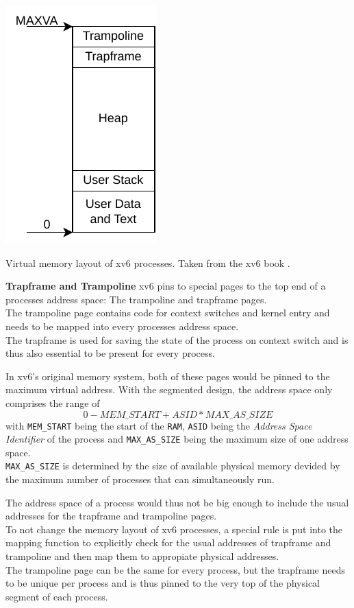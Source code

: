 \begin{marginfigure}
    \centering
    \includegraphics[scale=.8]{figures/prog_vm.pdf}
    \caption[xv6 memory layout]{Virtual memory layout of xv6 processes. Taken from the xv6 book \cite{cox2011xv6}.}
    \label{impl:proclayout}
\end{marginfigure}


\textbf{Trapframe and Trampoline} xv6 pins to special pages to the top end of a processes address space: The trampoline and trapframe pages.\\
The trampoline page contains code for context switches and kernel entry and needs to be mapped
into every processes address space.\\
The trapframe is used for saving the state of the process on context switch and is thus also essential to be present for every process.

In xv6's original memory system, both of these pages would be pinned to the maximum virtual address.
With the segmented design, the address space only comprises the range of \[
    0 - MEM\_START+ASID*MAX\_AS\_SIZE
\]
with \texttt{MEM\_START} being the start of the \texttt{RAM}, \texttt{ASID} being the \emph{Address Space Identifier} of the process and \texttt{MAX\_AS\_SIZE} being the maximum size of one address space.\\
\texttt{MAX\_AS\_SIZE} is determined by the size of available physical memory devided by the maximum
number of processes that can simultaneously run.

The address space of a process would thus not be big enough to include the usual addresses for the
trapframe and trampoline pages.\\
To not change the memory layout of xv6 processes, a special rule is put into the mapping function
to explicitly check for the usual addresses of trapframe and trampoline and then map them to appropiate physical addresses.\\
The trampoline page can be the same for every process, but the trapframe needs to be unique per
process and is thus pinned to the very top of the physical segment of each process.


